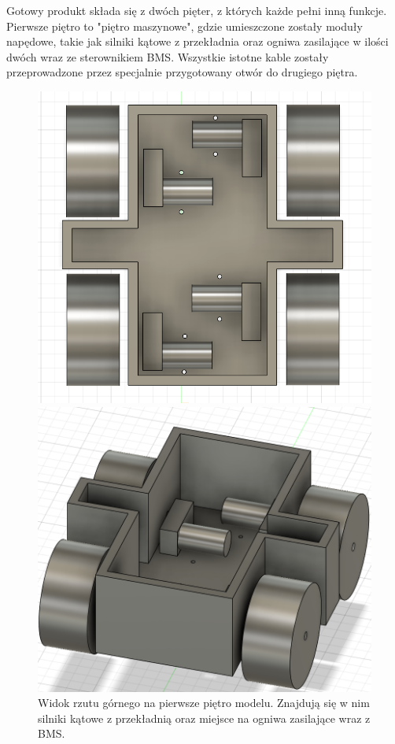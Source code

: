 \documentclass{report}
\begin{document}
\newpage

Gotowy produkt składa się z dwóch pięter, z których każde pełni inną funkcje. 
Pierwsze piętro to "piętro maszynowe", gdzie umieszczone zostały moduły napędowe, takie jak silniki kątowe z przekładnia oraz ogniwa zasilające w ilości dwóch wraz ze sterownikiem BMS. 
Wszystkie istotne kable zostały przeprowadzone przez specjalnie przygotowany otwór do drugiego piętra.

\begin{figure}[htbp]
    \centering
    \begin{minipage}[b]{0.45\textwidth}
        \centering
        \includegraphics[width=\textwidth]{src/Robot_pics/Dol.png}
        \caption{Widok rzutu górnego na pierwsze piętro modelu. Znajdują się w nim silniki kątowe z przekładnią oraz miejsce na ogniwa zasilające wraz z BMS.}
        \label{fig:zdjecie1-robo}
    \end{minipage}
    \hfill
    \begin{minipage}[b]{0.45\textwidth}
        \centering
        \includegraphics[width=\textwidth]{src/Robot_pics/Dol 1.png}

\end{minipage}
\end{figure}
\end{document}
